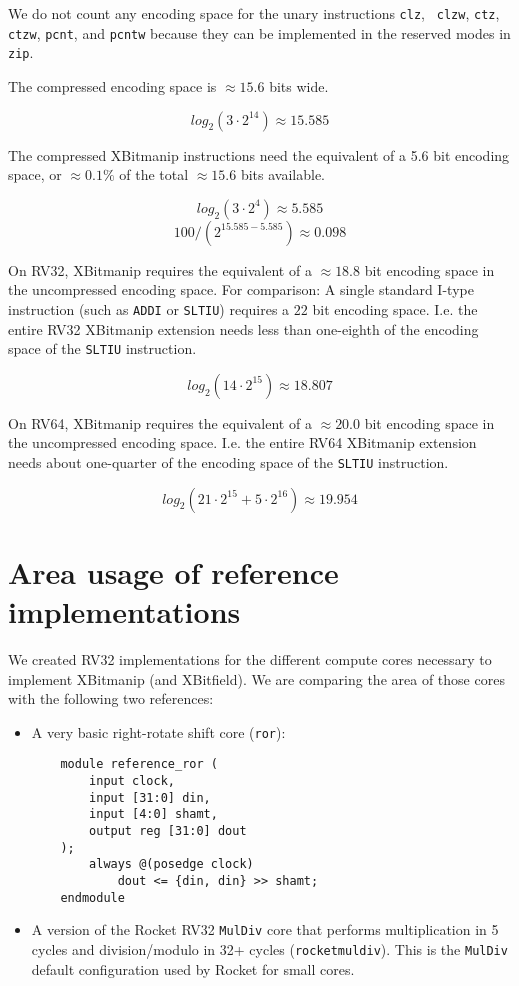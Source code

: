 We do not count any encoding space for the unary instructions {\tt clz}, {\tt
clzw}, {\tt ctz}, {\tt ctzw}, {\tt pcnt}, and {\tt pcntw} because they can
be implemented in the reserved modes in {\tt zip}.

The compressed encoding space is $\approx 15.6$ bits wide.

$$ log_2(3 \cdot 2^{14}) \approx 15.585 $$

The compressed XBitmanip instructions need the equivalent of a 5.6 bit
encoding space, or $\approx 0.1\%$ of the total $\approx 15.6$ bits available.

$$ log_2(3 \cdot 2^4) \approx 5.585 $$
$$ 100 / (2^{15.585-5.585}) \approx 0.098 $$

On RV32, XBitmanip requires the equivalent of a $\approx 18.8$ bit encoding space in
the uncompressed encoding space. For comparison: A single standard I-type
instruction (such as \texttt{ADDI} or \texttt{SLTIU}) requires a $22$ bit
encoding space. I.e. the entire RV32 XBitmanip extension needs less than
one-eighth of the encoding space of the \texttt{SLTIU} instruction.

$$ log_2(14\cdot2^{15}) \approx 18.807 $$

On RV64, XBitmanip requires the equivalent of a $\approx 20.0$ bit encoding
space in the uncompressed encoding space. I.e. the entire RV64 XBitmanip
extension needs about one-quarter of the encoding space of the \texttt{SLTIU}
instruction.

$$ log_2(21\cdot2^{15} + 5\cdot2^{16}) \approx 19.954 $$

\section{Area usage of reference implementations}

We created RV32 implementations for the different compute cores necessary to
implement XBitmanip (and XBitfield). We are comparing the area of those cores
with the following two references:

\begin{itemize}
\item A very basic right-rotate shift core ({\tt ror}):
\begin{verbatim}
    module reference_ror (
        input clock,
        input [31:0] din,
        input [4:0] shamt,
        output reg [31:0] dout
    );
        always @(posedge clock)
            dout <= {din, din} >> shamt;
    endmodule
\end{verbatim}
\item A version of the Rocket RV32 {\tt MulDiv} core that performs multiplication
in 5 cycles and division/modulo in 32+ cycles ({\tt rocketmuldiv}). This is the
{\tt MulDiv} default configuration used by Rocket for small cores.
\end{itemize}

